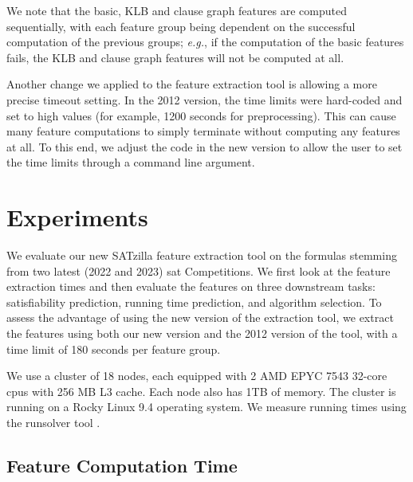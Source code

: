 We note that the basic, KLB and clause graph features are computed sequentially, with each feature group being dependent on the successful computation of the previous groups; \emph{e.g.}, if the computation of the basic features fails, the KLB and clause graph features will not be computed at all.

Another change we applied to the feature extraction tool is allowing a more precise timeout setting. In the 2012 version, the time limits were hard-coded and set to high values (for example, 1200 seconds for preprocessing). This can cause many feature computations to simply terminate without computing any features at all. To this end, we adjust the code in the new version to allow the user to set the time limits through a command line argument.

\section{Experiments}
\label{sec:ch04:experiments}
We evaluate our new SATzilla feature extraction tool on the formulas stemming from two latest (2022 and 2023) \gls{sat} Competitions. We first look at the feature extraction times and then evaluate the features on three downstream tasks: satisfiability prediction, running time prediction, and algorithm selection.
To assess the advantage of using the new version of the extraction tool, we extract the features using both our new version and the 2012 version of the tool, with a time limit of 180 seconds per feature group.

We use a cluster of 18 nodes, each equipped with 2 AMD EPYC 7543 32-core \glspl{cpu} with 256 MB L3 cache. Each node also has 1TB of memory. The cluster is running on a Rocky Linux 9.4 operating system. We measure running times using the runsolver tool \cite{Roussel11c}.

\subsection{Feature Computation Time}
\label{sec:ch04:feature-computation-time}

